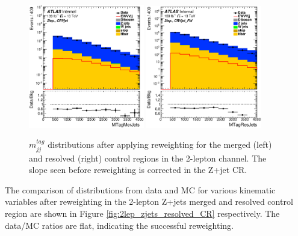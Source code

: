 \begin{figure}[ht]
    \centering
    \includegraphics[width=0.45\textwidth]{figures/2lep/reweighting/after_reweighting/C_0ptag1pfat0pjet_0ptv_CRVjet_MTagMerJets_Log.eps}
    \includegraphics[width=0.45\textwidth]{figures/2lep/reweighting/after_reweighting/C_0ptag2pjet_0ptv_CRVjet_Fid_MTagResJets_Log.eps}
    \caption{ $m^{tag}_{jj}$ distributions after applying reweighting for the merged (left) and resolved (right) control regions in the 2-lepton channel. The slope seen before reweighting is corrected in the Z+jet CR.}
    \label{fig:2lep_mtag_before_rw}
\end{figure}


The comparison of distributions from data and MC for various kinematic variables after reweighting in the 2-lepton Z+jets merged and resolved control region are shown in Figure \ref{fig:2lep_zjets_resolved_CR}
respectively. The data/MC ratios are flat, indicating the successful reweighting.

